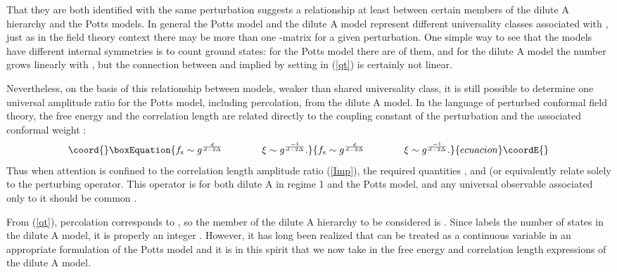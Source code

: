 \documentclass[a4paper,a4paper]{article}
\begin{document}
That they are both identified with the same perturbation \coordHE{} 
suggests a relationship at least
between certain members of the dilute A\coordHE{} hierarchy and the Potts models. 
In general the Potts model and the dilute A model represent 
different universality classes associated with \coordHE{}, just
as in the field theory context there may be more than one \coordHE{}-matrix 
for a given perturbation. 
One simple way to see that the models have different internal 
symmetries is to count ground states: for the Potts
model there are \coordHE{} of them, and for the dilute A model the number
grows linearly with \coordHE{}, but the connection between \coordHE{} and \coordHE{}
implied by setting \coordHE{} in (\ref{qt}) is certainly not linear.

Nevertheless, on the basis of this relationship between models,
weaker than shared
universality class, it is still possible to determine one
universal amplitude ratio for the Potts model, including 
percolation, from the dilute
A model. 
In the language of perturbed conformal field theory, the free energy and 
the correlation
length are related directly to the coupling constant \coordHE{} of the perturbation 
and the
associated conformal weight \myHighlight{$\Delta$}\coordHE{}:
\begin{equation*}\coord{}\boxEquation{
f_{\rm s} \sim  g^{\frac{d}{d-2\Delta}} \qquad \qquad
\xi    \sim  g^{\frac{-1}{d-2\Delta}}.
}{
f_{\rm s} \sim  g^{\frac{d}{d-2\Delta}} \qquad \qquad
\xi    \sim  g^{\frac{-1}{d-2\Delta}}.
}{ecuacion}\coordE{}\end{equation*}
Thus when attention is confined to the correlation length amplitude ratio 
(\ref{Imp}),
the required quantities \coordHE{}, \coordHE{} and \myHighlight{$\alpha$}\coordHE{} (or 
equivalently \myHighlight{$\Delta)$}\coordHE{}
relate solely to the perturbing operator. This operator is \coordHE{}
for both  dilute A in regime 1 and the Potts model, and any universal 
observable associated only
to it should be common \cite{delf2}.



From (\ref{qt}), percolation corresponds to \coordHE{}, so the member of
the dilute A hierarchy to be considered is \coordHE{}.
Since \coordHE{} labels the number of states in the dilute A\coordHE{} model, 
it is properly an integer \coordHE{}.
However, it has long been realized that \coordHE{} can
be treated as a continuous variable in an appropriate
formulation of the Potts model \cite{FK} and it is in this spirit
that we now take \coordHE{} in the free energy and correlation length
expressions of the dilute A model. 
\end{document}
